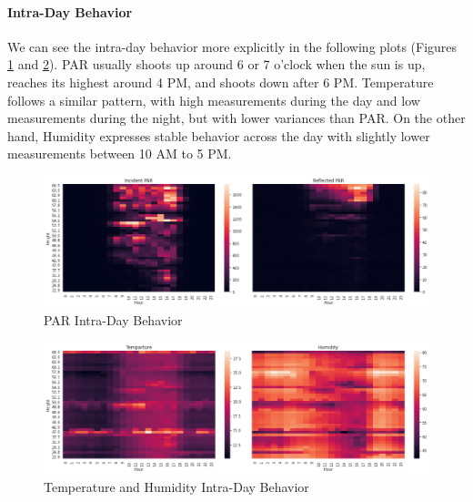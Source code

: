 \documentclass[11pt, letterpaper]{article}
\begin{document}
\paragraph{Intra-Day Behavior}
We can see the intra-day behavior more explicitly in the following plots (Figures \ref{fig:par-intra-day} and \ref{fig:th-intra-day}). PAR usually shoots up around 6 or 7 o'clock when the sun is up, reaches its highest around 4 PM, and shoots down after 6 PM. Temperature follows a similar pattern, with high measurements during the day and low measurements during the night, but with lower variances than PAR. On the other hand, Humidity expresses stable behavior across the day with slightly lower measurements between 10 AM to 5 PM.
\begin{figure}[h!]
\centering
\includegraphics[width=1\textwidth]{eda_3.2.png}
\captionsetup{justification=centering}
\caption{PAR Intra-Day Behavior}
\label{fig:par-intra-day}
\end{figure}
\begin{figure}[h!]
\centering
\includegraphics[width=1\textwidth]{eda_3.3.png}
\captionsetup{justification=centering}
\caption{Temperature and Humidity Intra-Day Behavior}
\label{fig:th-intra-day}
\end{figure}
\end{document}
